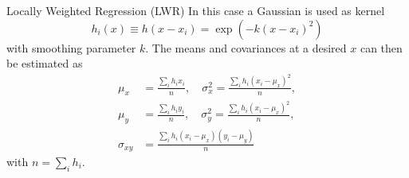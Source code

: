 \begin{frame}{Locally Weighted Regression (LWR)}
In this case a Gaussian is used as kernel
\begin{equation}
h_i(x) \equiv h(x-x_i) = \exp(-k(x-x_i)^2)
\end{equation}
with smoothing parameter $k$. The means and covariances at a desired $x$ can
then be estimated as
\begin{equation}\begin{split}
  \mu_x &= \frac{\sum_i h_ix_i}{n}, \quad
  \sigma_x^2 = \frac{\sum_i h_i(x_i-\mu_x)^2}{n}, \\
  \mu_y &= \frac{\sum_i h_iy_i}{n}, \quad
  \sigma_y^2 = \frac{\sum_i h_i(x_i-\mu_x)^2}{n}, \\
  \sigma_{xy} &= \frac{\sum_i h_i(x_i-\mu_x)(y_i-\mu_y)}{n}
\end{split}\end{equation}
with $n = \sum_i h_i$.
\end{frame}

